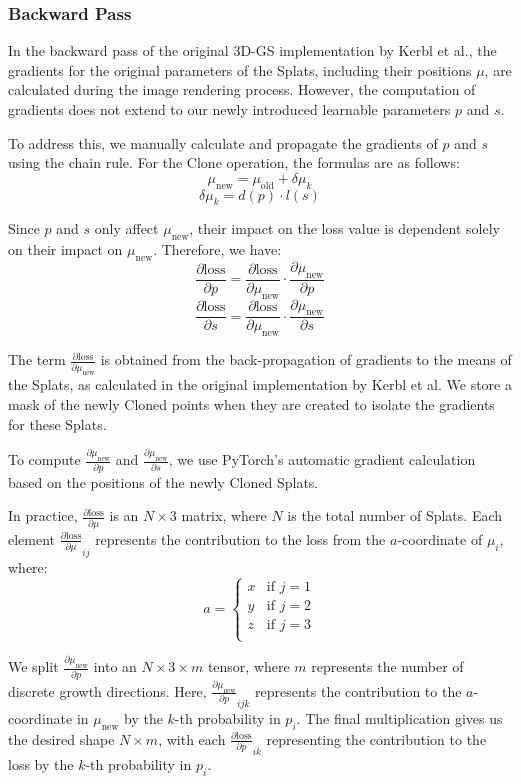 \documentclass[11pt]{report}
\begin{document}
\subsubsection{Backward Pass}
In the backward pass of the original 3D-GS implementation by Kerbl et al., the gradients for the original parameters of the Splats, including their positions $\mu$, are calculated during the image rendering process. However, the computation of gradients does not extend to our newly introduced learnable parameters $p$ and $s$.

To address this, we manually calculate and propagate the gradients of $p$ and $s$ using the chain rule. For the Clone operation, the formulas are as follows:
\[ \mu_{\text{new}} = \mu_{\text{old}} + \delta \mu_k \]
\[ \delta \mu_k = d(p) \cdot l(s) \]

Since $p$ and $s$ only affect $\mu_{\text{new}}$, their impact on the loss value is dependent solely on their impact on $\mu_{\text{new}}$. Therefore, we have:
\[ \frac{\partial \text{loss}}{\partial p} = \frac{\partial \text{loss}}{\partial \mu_{\text{new}}} \cdot \frac{\partial \mu_{\text{new}}}{\partial p} \]
\[ \frac{\partial \text{loss}}{\partial s} = \frac{\partial \text{loss}}{\partial \mu_{\text{new}}} \cdot \frac{\partial \mu_{\text{new}}}{\partial s} \]

The term $\frac{\partial \text{loss}}{\partial \mu_{\text{new}}}$ is obtained from the back-propagation of gradients to the means of the Splats, as calculated in the original implementation by Kerbl et al. We store a mask of the newly Cloned points when they are created to isolate the gradients for these Splats.

To compute $\frac{\partial \mu_{\text{new}}}{\partial p}$ and $\frac{\partial \mu_{\text{new}}}{\partial s}$, we use PyTorch's automatic gradient calculation based on the positions of the newly Cloned Splats.

In practice, $\frac{\partial \text{loss}}{\partial \mu}$ is an $N \times 3$ matrix, where $N$ is the total number of Splats. Each element $\frac{\partial \text{loss}}{\partial \mu}_{ij}$ represents the contribution to the loss from the $a$-coordinate of $\mu_{i}$, where:
\[ a = \begin{cases}
x & \textrm{if }j=1\\
y & \textrm{if }j=2\\
z & \textrm{if }j=3\\
\end{cases} \]

We split $\frac{\partial \mu_{\text{new}}}{\partial p}$ into an $N \times 3 \times m$ tensor, where $m$ represents the number of discrete growth directions. Here, $\frac{\partial \mu_{\text{new}}}{\partial p}_{ijk}$ represents the contribution to the $a$-coordinate in $\mu_{\text{new}}$ by the $k$-th probability in $p_i$. The final multiplication gives us the desired shape $N \times m$, with each $\frac{\partial \text{loss}}{\partial p}_{ik}$ representing the contribution to the loss by the $k$-th probability in $p_i$.
\end{document}
